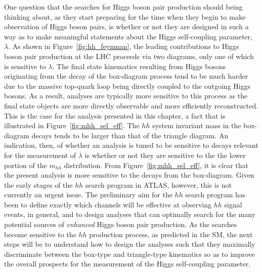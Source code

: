 One question that the searches for Higgs boson pair production should being thinking about,
as they start preparing for the time when they begin to make observation of Higgs boson pairs,
is whether or not they are designed in such a way as to make meaningful statements about the
Higgs self-coupling parameter, $\lambda$.
As shown in Figure~\ref{fig:hh_feynman}, the leading contributions to Higgs boson pair production
at the LHC proceeds via two diagrams, only one of which is sensitive to $\lambda$.
The final state kinematics resulting from Higgs bosons originating from the decay of the box-diagram
process tend to be much harder due to the massive top-quark loop being directly coupled to the outgoing Higgs bosons.
As a result, analyses are typically more sensitive to this process as the final state objects are
more directly observable and more efficiently reconstructed.
This is the case for the analysis presented in this chapter, a fact that is illustrated in Figure~\ref{fig:mhh_sel_eff}.
The $hh$ system invariant mass in the box-diagram decays
tends to be larger than that of the triangle diagram.
An indication, then, of whether an analysis is tuned to be sensitive to decays relevant
for the measurement of $\lambda$ is whether or not they are sensitive to the the lower portion of the $m_{hh}$ distribution.
From Figure~\ref{fig:mhh_sel_eff}, it is clear that the present analysis is more sensitive to the decays from the box-diagram.
Given the early stages of the $hh$ search program in ATLAS, however, this is not currently
an urgent issue.
The preliminary aim for the $hh$ search program has been to define exactly which channels will be effective
at observing $hh$ signal events, in general, and to design analyses that can optimally search
for the many potential sources of \textit{enhanced} Higgs boson pair production.
As the searches become sensitive to the $hh$ production process, as predicted in the SM,
the next steps will be to understand how to design the analyses such that they maximally
discriminate between the box-type and triangle-type kinematics so as to improve the overall prospects
for the measurement of the Higgs self-coupling parameter.

